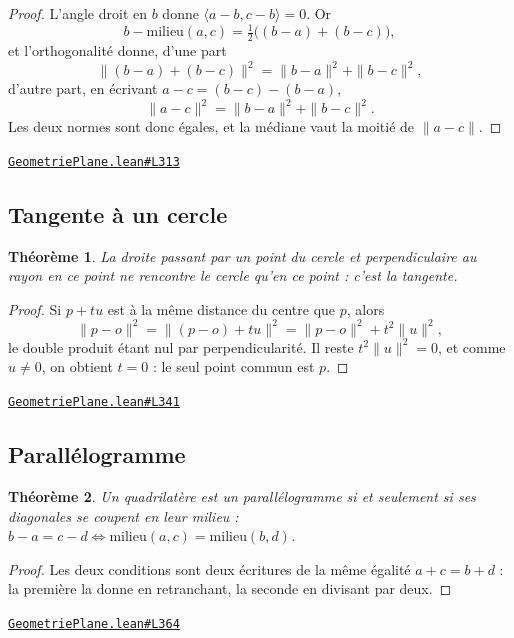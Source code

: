 \documentclass[11pt,a4paper]{article}
\theoremstyle{definition}
\theoremstyle{plain}
\newtheorem{theoreme}{Théorème}
\newcommand{\source}[2]{\par\smallskip\noindent\hfill{\footnotesize\href{#1}{\texttt{#2}}}\par\smallskip}
\begin{document}
\begin{proof}
L'angle droit en $b$ donne $\langle a - b, c - b\rangle = 0$. Or
\[ b - \text{milieu}(a,c) = \tfrac{1}{2}\bigl((b-a) + (b-c)\bigr) , \]
et l'orthogonalité donne, d'une part
\[ \|(b-a) + (b-c)\|^2 = \|b-a\|^2 + \|b-c\|^2 , \]
d'autre part, en écrivant $a - c = (b-c) - (b-a)$,
\[ \|a-c\|^2 = \|b-a\|^2 + \|b-c\|^2 . \]
Les deux normes sont donc égales, et la médiane vaut la moitié de $\|a - c\|$.
\end{proof}
\source{https://github.com/Commutator-IO/learn-lean/blob/main/courses/01-college/02-geometrie-plane/GeometriePlane.lean\#L313}{GeometriePlane.lean\#L313}

\subsection{Tangente à un cercle}

\begin{theoreme}
La droite passant par un point du cercle et perpendiculaire au rayon en ce point ne
rencontre le cercle qu'en ce point : c'est la tangente.
\end{theoreme}

\begin{proof}
Si $p + tu$ est à la même distance du centre que $p$, alors
\[ \|p - o\|^2 = \|(p-o) + tu\|^2 = \|p-o\|^2 + t^2\|u\|^2 , \]
le double produit étant nul par perpendicularité. Il reste $t^2\|u\|^2 = 0$, et comme
$u \ne 0$, on obtient $t = 0$ : le seul point commun est $p$.
\end{proof}
\source{https://github.com/Commutator-IO/learn-lean/blob/main/courses/01-college/02-geometrie-plane/GeometriePlane.lean\#L341}{GeometriePlane.lean\#L341}

\subsection{Parallélogramme}

\begin{theoreme}
Un quadrilatère est un parallélogramme si et seulement si ses diagonales se coupent en
leur milieu : $b - a = c - d \iff \text{milieu}(a,c) = \text{milieu}(b,d)$.
\end{theoreme}

\begin{proof}
Les deux conditions sont deux écritures de la même égalité $a + c = b + d$ : la
première la donne en retranchant, la seconde en divisant par deux.
\end{proof}
\source{https://github.com/Commutator-IO/learn-lean/blob/main/courses/01-college/02-geometrie-plane/GeometriePlane.lean\#L364}{GeometriePlane.lean\#L364}
\end{document}
